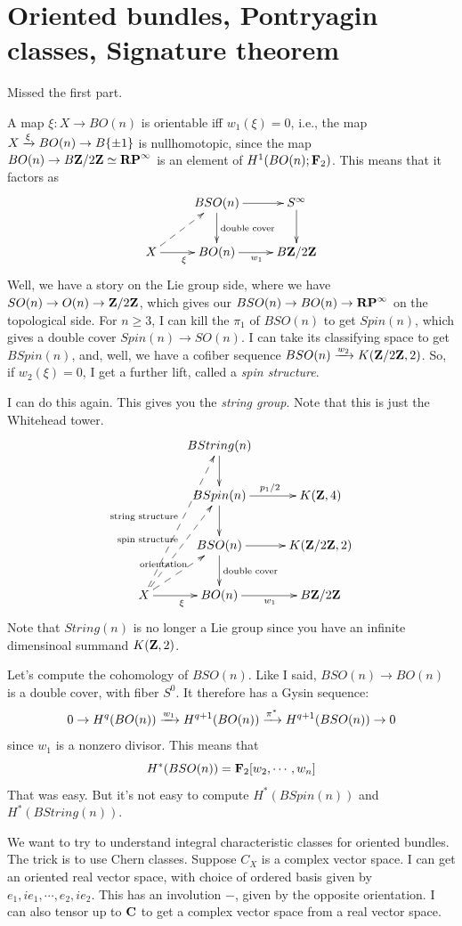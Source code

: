 \section{Oriented bundles, Pontryagin classes, Signature theorem}
Missed the first part.

A map $\xi:X\to BO(n)$ is orientable iff $w_1(\xi) = 0$, i.e., the map $X\xrightarrow{{\xi}} BO(n)\to B\{\pm 1\}$ is nullhomotopic, since the map $BO(n) \to B\mathbf Z/2\mathbf Z\simeq\mathbf{RP}^\infty$ is an element of $H^1(BO(n);\mathbf F_2)$.
This means that it factors as
$$
\xymatrix{
    & BSO(n)\ar[r]\ar[d]^{\text{double cover}} & S^\infty\ar[d]\\
    X\ar@{-->}[ur]\ar[r]_{\xi} & BO(n)\ar[r]_{w_1} & B\Z/2\Z
}
$$
Well, we have a story on the Lie group side, where we have $SO(n)\to O(n)\to\mathbf Z/2\mathbf Z$, which gives our $BSO(n)\to BO(n)\to \mathbf{RP}^\infty$ on the topological side.
For $n\geq 3$, I can kill the $\pi_1$ of $BSO(n)$ to get $Spin(n)$, which gives a double cover $Spin(n)\to SO(n)$.
I can take its classifying space to get $BSpin(n)$, and, well, we have a cofiber sequence $BSO(n)\xrightarrow{{w_2}} K(\mathbf Z/2\mathbf Z,2)$.
So, if $w_2(\xi) = 0$, I get a further lift, called a \emph{spin structure}.

I can do this again.
This gives you the \emph{string group}.
Note that this is just the Whitehead tower.
$$
\xymatrix{
    & BString(n)\ar[d] & \\
    & BSpin(n)\ar[d] \ar[r]^{p_1/2} & K(\Z,4)\\
    & BSO(n)\ar[r]\ar[d]^{\text{double cover}} & K(\Z/2\Z,2)\\
    X\ar@{-->}[ur]^{\text{orientation}}\ar@{-->}[uur]^{\text{spin structure}}\ar@{-->}[uuur]^{\text{string structure}}\ar[r]_{\xi} & BO(n)\ar[r]_{w_1} & B\Z/2\Z
}
$$
Note that $String(n)$ is no longer a Lie group since you have an infinite dimensinoal summand $K(\mathbf Z,2)$.

Let's compute the cohomology of $BSO(n)$.
Like I said, $BSO(n)\to BO(n)$ is a double cover, with fiber $S^0$.
It therefore has a Gysin sequence:
$$
0\to H^q(BO(n)) \xrightarrow{{w_1}} H^{q+1}(BO(n)) \xrightarrow{{\pi^\ast}} H^{q+1}(BSO(n)) \to 0
$$
since $w_1$ is a nonzero divisor.
This means that
$$
H^\ast(BSO(n)) = \mathbf F_2[w_2,\cdots,w_n]
$$
That was easy.
But it's not easy to compute $H^\ast(BSpin(n))$ and $H^\ast(BString(n))$.

We want to try to understand integral characteristic classes for oriented bundles.
The trick is to use Chern classes.
Suppose $C_X$ is a complex vector space.
I can get an oriented real vector space, with choice of ordered basis given by $e_1,ie_1,\cdots,e_2,ie_2$.
This has an involution $-$, given by the opposite orientation.
I can also tensor up to $\mathbf C$ to get a complex vector space from a real vector space.

